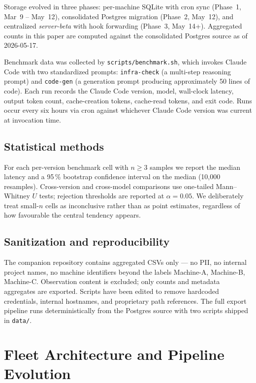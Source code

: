 \documentclass[11pt,a4paper]{article}
\begin{document}
Storage evolved in three phases: per-machine SQLite with cron sync
(Phase~1, Mar~9 -- May~12), consolidated Postgres migration (Phase~2, May~12),
and centralized \emph{server-beta} with hook forwarding (Phase~3, May~14+).
Aggregated counts in this paper are computed against the consolidated Postgres
source as of 2026-05-17.

Benchmark data was collected by \texttt{scripts/benchmark.sh}, which invokes
Claude Code with two standardized prompts:
\texttt{infra-check} (a multi-step reasoning prompt) and \texttt{code-gen}
(a generation prompt producing approximately 50 lines of code). Each run records
the Claude Code version, model, wall-clock latency, output token count,
cache-creation tokens, cache-read tokens, and exit code. Runs occur every six
hours via cron against whichever Claude Code version was current at invocation
time.

\subsection{Statistical methods}

For each per-version benchmark cell with $n \geq 3$ samples we report the
median latency and a 95\,\% bootstrap confidence interval on the median
(10{,}000 resamples). Cross-version and cross-model comparisons use one-tailed
Mann--Whitney $U$ tests; rejection thresholds are reported at $\alpha = 0.05$.
We deliberately treat small-$n$ cells as inconclusive rather than as
point estimates, regardless of how favourable the central tendency appears.

\subsection{Sanitization and reproducibility}

The companion repository contains aggregated CSVs only --- no PII, no internal
project names, no machine identifiers beyond the labels Machine-A, Machine-B,
Machine-C. Observation content is excluded; only counts and metadata aggregates
are exported. Scripts have been edited to remove hardcoded credentials,
internal hostnames, and proprietary path references. The full export pipeline
runs deterministically from the Postgres source with two scripts shipped in
\texttt{data/}.

\section{Fleet Architecture and Pipeline Evolution}
\end{document}
